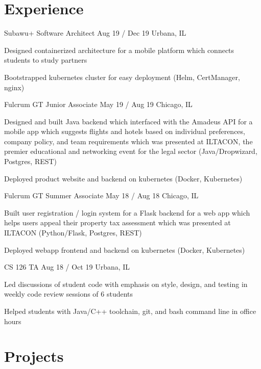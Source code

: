 \documentclass[hidelinks]{scrartcl}
\begin{document}
\color{textcolor}

\flushleft
{\Huge\bfseries{\color{mycolor}{Adrian Herath}}}

{\small}

\section{Experience}

\position
{Subawu+}
{Software Architect}
{Aug 19 {\color{mycolor}/} Dec 19}
{Urbana, IL}
{
\item Designed containerized architecture for a mobile platform which connects 
    students to study partners
\item Bootstrapped kubernetes cluster for easy deployment (Helm, CertManager, nginx)
}

\position
{Fulcrum GT}
{Junior Associate}
{May 19 {\color{mycolor}/} Aug 19}
{Chicago, IL}
{
    \item Designed and built Java backend which interfaced with 
            the Amadeus API 
    for a mobile app which suggests
        flights and hotels based on individual preferences, company policy,
        and team requirements 
    which was presented at ILTACON, the premier educational and networking 
        event for the legal sector (Java/Dropwizard, Postgres, REST)
    \item Deployed product website and backend on kubernetes (Docker, Kubernetes)
}

\position
{Fulcrum GT}
{Summer Associate}
{May 18 {\color{mycolor}/} Aug 18}
{Chicago, IL}
{
    \item Built user registration / login system for a Flask backend 
    for a web app which helps users appeal their property tax assessment 
    which was presented at ILTACON (Python/Flask, Postgres, REST)
    \item Deployed webapp frontend and backend on kubernetes (Docker, Kubernetes)
}

\position
{CS 126}
{TA}
{Aug 18 {\color{mycolor}/} Oct 19}
{Urbana, IL}
{
    \item Led discussions of student code with emphasis on style, design, and
        testing in weekly code review sessions of 6 students
    \item Helped students with Java/C++ toolchain, git, and bash command line in
        office hours
}


\section{Projects}
\end{document}
